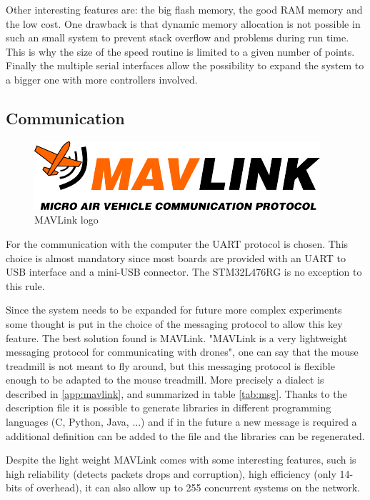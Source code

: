 \documentclass[12pt,a4paper]{article}
\begin{document}
Other interesting features are: the big flash memory, the good RAM memory and the low cost. One drawback is that dynamic memory allocation is not possible in such an small system to prevent stack overflow and problems during run time. This is why the size of the speed routine is limited to a given number of points.
Finally the multiple serial interfaces allow the possibility to expand the system to a bigger one with more controllers involved.

\subsection{Communication}
\begin{figure}
	\includegraphics[width=\linewidth]{fig/MAVLink_logo.png}
	\caption{MAVLink logo}\label{fig:MAVLink_logo}
\end{figure}
For the communication with the computer the UART protocol is chosen. This choice is almost mandatory since most boards are provided with an UART to USB interface and a mini-USB connector. The STM32L476RG is no exception to this rule.

Since the system needs to be expanded for future more complex experiments some thought is put in the choice of the messaging protocol to allow this key feature.
The best solution found is MAVLink. "MAVLink is a very lightweight messaging protocol for communicating with drones"\cite{mavlink}, one can say that the mouse treadmill is not meant to fly around, but this messaging protocol is flexible enough to be adapted to the mouse treadmill.
More precisely a dialect is described in \ref{app:mavlink}, and summarized in table \ref{tab:msg}. Thanks to the description file it is possible to generate libraries in different programming languages (C, Python, Java, ...) and if in the future a new message is required a additional definition can be added to the file and the libraries can be regenerated.

Despite the light weight MAVLink comes with some interesting features, such is high reliability (detects packets drops and corruption), high efficiency (only 14-bits of overhead), it can also allow up to 255 concurrent systems on the network.
\end{document}
